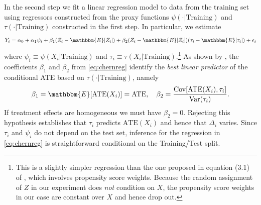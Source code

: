 \documentclass[oneside,11pt]{article}
\begin{document}
In the second step we fit a linear regression model to data from the training set using regressors constructed from the proxy functions $\psi(\cdot|\text{Training})$ and $\tau(\cdot|\text{Training})$ constructed in the first step. In particular, we estimate 
\begin{equation}
Y_i = \alpha_0 + \alpha_1 \psi_i + \beta_1 (Z_i - \mathbbm{E}[Z_i]) + \beta_2 (Z_i - \mathbbm{E}[Z_i])(\tau_i - \mathbbm{E}[\tau_i]) + \epsilon_i
\label{eq:chernreg}
\end{equation}
where $\psi_i \equiv \psi(X_i|\text{Training})$ and $\tau_i \equiv \tau(X_i|\text{Training})$.\footnote{This is a slightly simpler regression than the one proposed in equation (3.1) of \cite{chernozhukov2018generic}, which involves propensity score weights. Because the random assignment of $Z$ in our experiment does \emph{not} condition on $X$, the propensity score weights in our case are constant over $X$ and hence drop out.} As shown by \cite{chernozhukov2018generic}, the coefficients $\beta_1$ and $\beta_2$ from \eqref{eq:chernreg} identify the \emph{best linear predictor} of the conditional ATE based on $\tau(\cdot|\text{Training})$, namely
\[
\beta_1 = \mathbbm{E}[\text{ATE}(X_i)] = \text{ATE}, \quad
\beta_2 = \frac{\text{Cov}[\text{ATE}(X_i), \tau_i]}{\text{Var}(\tau_i)}.
\]
If treatment effects are homogeneous we must have $\beta_2 = 0$. Rejecting this hypothesis establishes that $\tau_i$ predicts $\text{ATE}(X_i)$ and hence that $\Delta_i$ varies. Since $\tau_i$ and $\psi_i$ do not depend on the test set, inference for the regression in \eqref{eq:chernreg} is straightforward conditional on the Training/Test split.  



\end{document}
